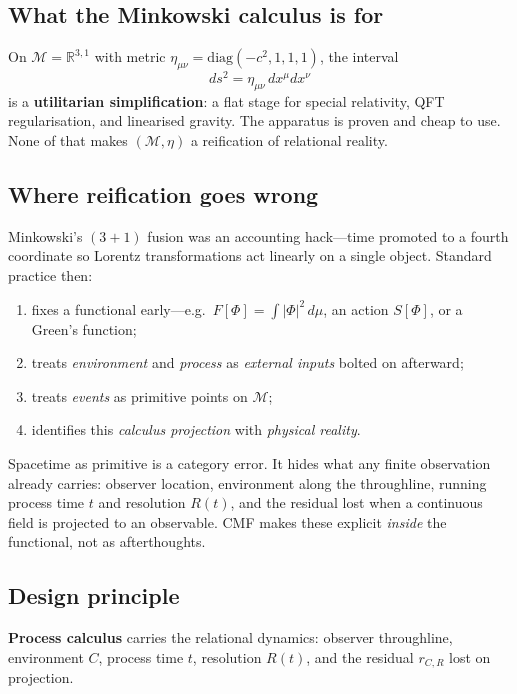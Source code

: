 \documentclass[11pt,a4paper]{article}
\newcommand{\M}{\mathcal{M}}
\newcommand{\Ph}{\Phi}
\begin{document}
\subsection{What the Minkowski calculus is for}

On $\M = \mathbb{R}^{3,1}$ with metric $\eta_{\mu\nu} = \mathrm{diag}(-c^2,1,1,1)$, the interval
\begin{equation}
  ds^2 = \eta_{\mu\nu}\, dx^\mu dx^\nu
\end{equation}
is a \textbf{utilitarian simplification}: a flat stage for special relativity, QFT regularisation, and linearised gravity. The apparatus is proven and cheap to use. None of that makes $(\M,\eta)$ a reification of relational reality.

\subsection{Where reification goes wrong}

Minkowski's $(3{+}1)$ fusion was an accounting hack---time promoted to a fourth coordinate so Lorentz transformations act linearly on a single object. Standard practice then:
\begin{enumerate}[noitemsep]
  \item fixes a functional early---e.g.\ $F[\Ph] = \int |\Ph|^2\, d\mu$, an action $S[\Ph]$, or a Green's function;
  \item treats \emph{environment} and \emph{process} as \emph{external inputs} bolted on afterward;
  \item treats \emph{events} as primitive points on $\M$;
  \item identifies this \emph{calculus projection} with \emph{physical reality}.
\end{enumerate}

Spacetime as primitive is a category error. It hides what any finite observation already carries: observer location, environment along the throughline, running process time $t$ and resolution $R(t)$, and the residual lost when a continuous field is projected to an observable. CMF makes these explicit \emph{inside} the functional, not as afterthoughts.

\subsection{Design principle}
\label{sec:design-principle}

\textbf{Process calculus} carries the relational dynamics: observer throughline, environment $C$, process time $t$, resolution $R(t)$, and the residual $r_{C,R}$ lost on projection.
\end{document}
